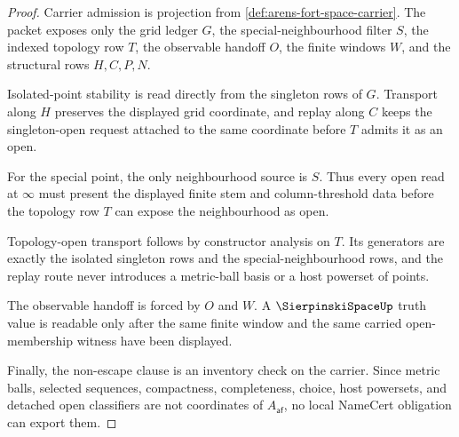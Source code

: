 \begin{proof}
Carrier admission is projection from \autoref{def:arens-fort-space-carrier}. The packet exposes only the grid ledger $G$, the special-neighbourhood filter $S$, the indexed topology row $T$, the observable handoff $O$, the finite windows $W$, and the structural rows $H,C,P,N$.

Isolated-point stability is read directly from the singleton rows of $G$. Transport along $H$ preserves the displayed grid coordinate, and replay along $C$ keeps the singleton-open request attached to the same coordinate before $T$ admits it as an open.

For the special point, the only neighbourhood source is $S$. Thus every open read at $\infty$ must present the displayed finite stem and column-threshold data before the topology row $T$ can expose the neighbourhood as open.

Topology-open transport follows by constructor analysis on $T$. Its generators are exactly the isolated singleton rows and the special-neighbourhood rows, and the replay route never introduces a metric-ball basis or a host powerset of points.

The observable handoff is forced by $O$ and $W$. A $\SierpinskiSpaceUp$ truth value is readable only after the same finite window and the same carried open-membership witness have been displayed.

Finally, the non-escape clause is an inventory check on the carrier. Since metric balls, selected sequences, compactness, completeness, choice, host powersets, and detached open classifiers are not coordinates of $A_{\mathsf{af}}$, no local NameCert obligation can export them.
\end{proof}





